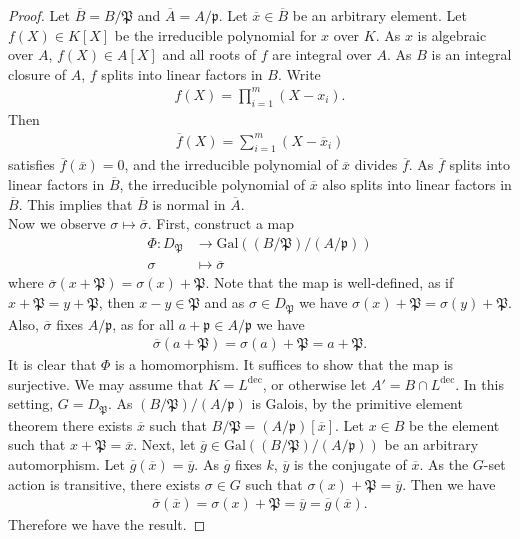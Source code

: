 \documentclass[12pt]{report}
\theoremstyle{plain}
\theoremstyle{remark}
\theoremstyle{definition}
\begin{document}
\begin{proof}
    Let $\overline{B}=B/\mathfrak{P}$ and $\overline{A}=A/\mathfrak{p}$. Let $\overline{x}\in\overline{B}$ be an arbitrary element. Let $f(X)\in K[X]$ be the irreducible polynomial for $x$ over $K$. As $x$ is algebraic over $A$, $f(X)\in A[X]$ and all roots of $f$ are integral over $A$. As $B$ is an integral closure of $A$, $f$ splits into linear factors in $B$. Write
    \begin{align*}
        f(X)=\prod_{i=1}^m(X-x_i).
    \end{align*}
    Then
    \begin{align*}
        \overline{f}(X)=\sum_{i=1}^m (X-\overline{x}_i)
    \end{align*}
    satisfies $\overline{f}(\overline{x})=0$, and the irreducible polynomial of $\overline{x}$ divides $\overline{f}$. As $\overline{f}$ splits into linear factors in $\overline{B}$, the irreducible polynomial of $\overline{x}$ also splits into linear factors in $\overline{B}$. This implies that $\overline{B}$ is normal in $\overline{A}$. \\
    Now we observe $\sigma\mapsto \overline{\sigma}$. First, construct a map
    \begin{align*}
        \Phi:D_{\mathfrak{P}} &\to \mathrm{Gal}((B/\mathfrak{P})/(A/\mathfrak{p})) \\
        \sigma &\mapsto \overline{\sigma}
    \end{align*}
    where $\overline{\sigma}(x+\mathfrak{P})=\sigma(x)+\mathfrak{P}$. Note that the map is well-defined, as if $x+\mathfrak{P}=y+\mathfrak{P}$, then $x-y\in\mathfrak{P}$ and as $\sigma\in D_\mathfrak{P}$ we have $\sigma(x)+\mathfrak{P}=\sigma(y)+\mathfrak{P}$. Also, $\overline{\sigma}$ fixes $A/\mathfrak{p}$, as for all $a+\mathfrak{p}\in A/\mathfrak{p}$ we have
    \begin{align*}
        \overline{\sigma}(a+\mathfrak{P})=\sigma(a)+\mathfrak{P}=a+\mathfrak{P}.
    \end{align*}
    It is clear that $\Phi$ is a homomorphism. It suffices to show that the map is surjective. We may assume that $K=L^\mathrm{dec}$, or otherwise let $A'=B\cap L^\mathrm{dec}$. In this setting, $G=D_\mathfrak{P}$. As $(B/\mathfrak{P})/(A/\mathfrak{p})$ is Galois, by the primitive element theorem there exists $\overline{x}$ such that $B/\mathfrak{P} = (A/\mathfrak{p})[\overline{x}]$. Let $x\in B$ be the element such that $x+\mathfrak{P}=\overline{x}$. Next, let $\overline{g}\in \mathrm{Gal}((B/\mathfrak{P})/(A/\mathfrak{p}))$ be an arbitrary automorphism. Let $\overline{g}(\overline{x})=\overline{y}$. As $\overline{g}$ fixes $k$, $\overline{y}$ is the conjugate of $\overline{x}$. As the $G$-set action is transitive, there exists $\sigma\in G$ such that $\sigma(x)+\mathfrak{P}=\overline{y}$. Then we have
    \begin{align*}
        \overline{\sigma}(\overline{x}) = \sigma(x)+\mathfrak{P}=\overline{y}=\overline{g}(\overline{x}).
    \end{align*}
    Therefore we have the result.
\end{proof}
\end{document}
